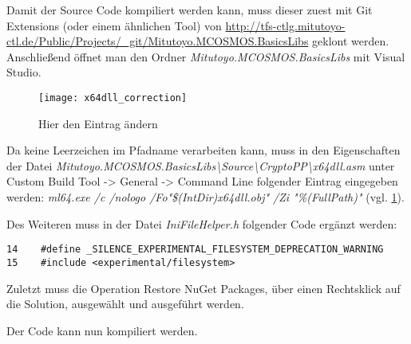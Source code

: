 Damit der Source Code kompiliert werden kann, muss dieser zuest mit Git Extensions (oder einem ähnlichen Tool) von
\url{http://tfs-ctlg.mitutoyo-ctl.de/Public/Projects/_git/Mitutoyo.MCOSMOS.BasicsLibs} geklont werden. \newline
Anschließend öffnet man den Ordner \textit{Mitutoyo.MCOSMOS.BasicsLibs} mit Visual Studio.

\begin{figure}[htpb]
    \centering
    \texttt{[image: x64dll\_correction]}
    \caption{Hier den Eintrag ändern}
    \label{img:x64dll_correction}
\end{figure}

Da  keine Leerzeichen im Pfadname verarbeiten kann, muss in den Eigenschaften der Datei
\textit{Mitutoyo.MCOSMOS.BasicsLibs\textbackslash Source\textbackslash CryptoPP\textbackslash x64dll.asm} unter \glqq{}Custom Build Tool\grqq{}
-> \glqq{}General\grqq{} -> \glqq{}Command Line\grqq{} folgender Eintrag eingegeben werden: \textit{ml64.exe /c /nologo /Fo"\$(IntDir)x64dll.obj" /Zi "\%(FullPath)"}
(vgl. \ref{img:x64dll_correction}).

Des Weiteren muss in der Datei \textit{IniFileHelper.h} folgender Code ergänzt werden:
\begin{lstlisting}
14    #define _SILENCE_EXPERIMENTAL_FILESYSTEM_DEPRECATION_WARNING
15    #include <experimental/filesystem>
\end{lstlisting}

Zuletzt muss die Operation \glqq{}Restore NuGet Packages\grqq{}, über einen Rechtsklick auf die Solution, ausgewählt und ausgeführt werden.

Der Code kann nun kompiliert werden.